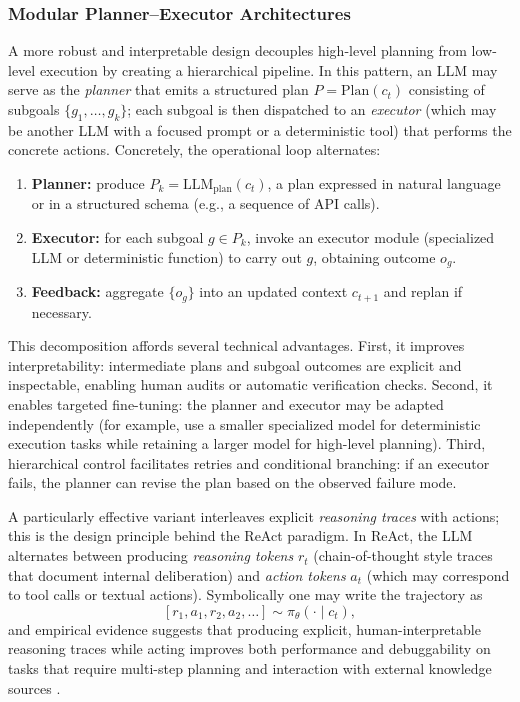 \subsubsection{Modular Planner–Executor Architectures}
\label{sec:planner_executor}

A more robust and interpretable design decouples high-level planning from low-level execution by creating a hierarchical pipeline.  In this pattern, an LLM may serve as the \emph{planner} that emits a structured plan $P=\text{Plan}(c_t)$ consisting of subgoals $\{g_1,\dots,g_k\}$; each subgoal is then dispatched to an \emph{executor} (which may be another LLM with a focused prompt or a deterministic tool) that performs the concrete actions.  Concretely, the operational loop alternates:

\begin{enumerate}
  \item \textbf{Planner:} produce $P_k = \text{LLM}_{\mathrm{plan}}(c_t)$, a plan expressed in natural language or in a structured schema (e.g., a sequence of API calls).
  \item \textbf{Executor:} for each subgoal $g \in P_k$, invoke an executor module (specialized LLM or deterministic function) to carry out $g$, obtaining outcome $o_g$.
  \item \textbf{Feedback:} aggregate $\{o_g\}$ into an updated context $c_{t+1}$ and replan if necessary.
\end{enumerate}

This decomposition affords several technical advantages.  First, it improves interpretability: intermediate plans and subgoal outcomes are explicit and inspectable, enabling human audits or automatic verification checks.  Second, it enables targeted fine-tuning: the planner and executor may be adapted independently (for example, use a smaller specialized model for deterministic execution tasks while retaining a larger model for high-level planning).  Third, hierarchical control facilitates retries and conditional branching: if an executor fails, the planner can revise the plan based on the observed failure mode.

A particularly effective variant interleaves explicit \emph{reasoning traces} with actions; this is the design principle behind the ReAct paradigm.  In ReAct, the LLM alternates between producing \emph{reasoning tokens} $r_t$ (chain-of-thought style traces that document internal deliberation) and \emph{action tokens} $a_t$ (which may correspond to tool calls or textual actions).  Symbolically one may write the trajectory as
\[
[r_1, a_1, r_2, a_2, \ldots] \sim \pi_\theta(\cdot \mid c_t),
\]
and empirical evidence suggests that producing explicit, human-interpretable reasoning traces while acting improves both performance and debuggability on tasks that require multi-step planning and interaction with external knowledge sources \cite{yao22}.

